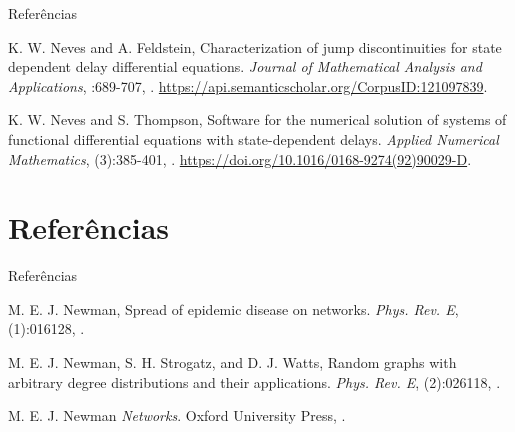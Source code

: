 \documentclass{beamer}
\theoremstyle{plain}
\theoremstyle{definition}
\begin{document}

\begin{frame}{Referências}


\begin{thebibliography}{3}



\beamertemplatearticlebibitems
{}
K. W. Neves and A. Feldstein,
\newblock Characterization of jump discontinuities for state dependent delay differential equations.
\newblock \emph{Journal of Mathematical Analysis and Applications},
:689-707,
.
\newblock \url{https://api.semanticscholar.org/CorpusID:121097839}.


\beamertemplatearticlebibitems
{}
K. W. Neves and S. Thompson,
\newblock Software for the numerical solution of systems of functional differential equations with state-dependent delays.
\newblock \emph{Applied Numerical Mathematics},
(3):385-401,
.
\newblock \url{https://doi.org/10.1016/0168-9274(92)90029-D}.

\end{thebibliography}
\end{frame}



\section{Referências}
\begin{frame}{Referências}


\begin{thebibliography}{4}

\beamertemplatearticlebibitems
{}
M. E. J. Newman,
\newblock Spread of epidemic disease on networks.
\newblock\emph{Phys. Rev. E},
(1):016128,
.

\beamertemplatearticlebibitems
{}
M. E. J. Newman, S. H. Strogatz, and D. J. Watts,
\newblock Random graphs with arbitrary degree distributions and their applications.
\newblock\emph{Phys. Rev. E},
(2):026118,
.


\beamertemplatebookbibitems
{}M. E. J. Newman \newblock\emph{Networks}.\newblock
\textlatin{Oxford University Press, }.

\end{thebibliography}
\end{frame}



\end{document}
